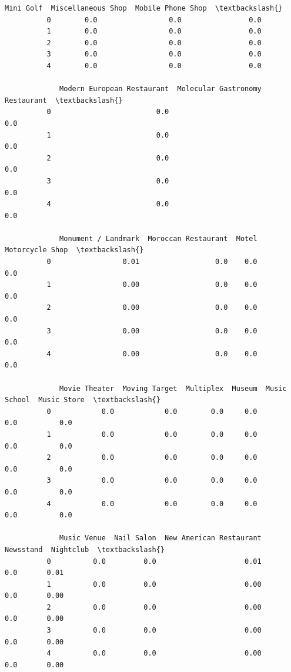 \documentclass[11pt]{article}
\begin{document}
\begin{Verbatim}[commandchars=\\\{\}]
             Mini Golf  Miscellaneous Shop  Mobile Phone Shop  \textbackslash{}
          0        0.0                 0.0                0.0   
          1        0.0                 0.0                0.0   
          2        0.0                 0.0                0.0   
          3        0.0                 0.0                0.0   
          4        0.0                 0.0                0.0   
          
             Modern European Restaurant  Molecular Gastronomy Restaurant  \textbackslash{}
          0                         0.0                              0.0   
          1                         0.0                              0.0   
          2                         0.0                              0.0   
          3                         0.0                              0.0   
          4                         0.0                              0.0   
          
             Monument / Landmark  Moroccan Restaurant  Motel  Motorcycle Shop  \textbackslash{}
          0                 0.01                  0.0    0.0              0.0   
          1                 0.00                  0.0    0.0              0.0   
          2                 0.00                  0.0    0.0              0.0   
          3                 0.00                  0.0    0.0              0.0   
          4                 0.00                  0.0    0.0              0.0   
          
             Movie Theater  Moving Target  Multiplex  Museum  Music School  Music Store  \textbackslash{}
          0            0.0            0.0        0.0     0.0           0.0          0.0   
          1            0.0            0.0        0.0     0.0           0.0          0.0   
          2            0.0            0.0        0.0     0.0           0.0          0.0   
          3            0.0            0.0        0.0     0.0           0.0          0.0   
          4            0.0            0.0        0.0     0.0           0.0          0.0   
          
             Music Venue  Nail Salon  New American Restaurant  Newsstand  Nightclub  \textbackslash{}
          0          0.0         0.0                     0.01        0.0       0.01   
          1          0.0         0.0                     0.00        0.0       0.00   
          2          0.0         0.0                     0.00        0.0       0.00   
          3          0.0         0.0                     0.00        0.0       0.00   
          4          0.0         0.0                     0.00        0.0       0.00   
          

\end{Verbatim}
\end{document}
